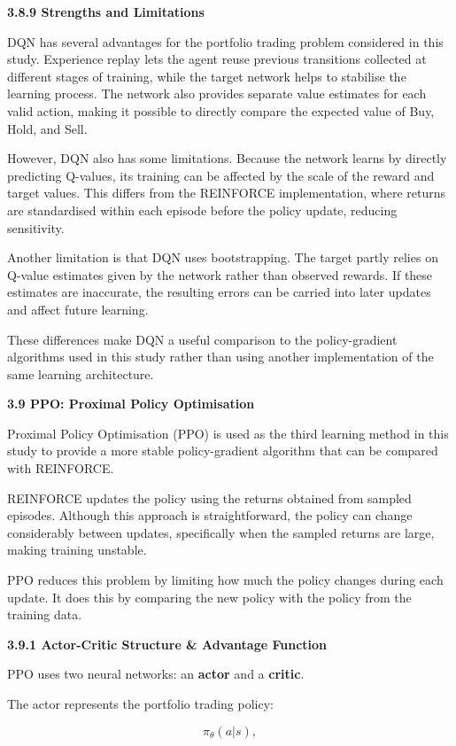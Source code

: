 \textbf{3.8.9 Strengths and Limitations}

DQN has several advantages for the portfolio trading problem considered
in this study. Experience replay lets the agent reuse previous
transitions collected at different stages of training, while the target
network helps to stabilise the learning process. The network also
provides separate value estimates for each valid action, making it
possible to directly compare the expected value of Buy, Hold, and Sell.

However, DQN also has some limitations. Because the network learns by
directly predicting Q-values, its training can be affected by the scale
of the reward and target values. This differs from the REINFORCE
implementation, where returns are standardised within each episode
before the policy update, reducing sensitivity.

Another limitation is that DQN uses bootstrapping. The target partly
relies on Q-value estimates given by the network rather than observed
rewards. If these estimates are inaccurate, the resulting errors can be
carried into later updates and affect future learning.

These differences make DQN a useful comparison to the policy-gradient
algorithms used in this study rather than using another implementation
of the same learning architecture.

\textbf{3.9 PPO: Proximal Policy Optimisation}

Proximal Policy Optimisation (PPO) is used as the third learning method
in this study to provide a more stable policy-gradient algorithm that
can be compared with REINFORCE.

REINFORCE updates the policy using the returns obtained from sampled
episodes. Although this approach is straightforward, the policy can
change considerably between updates, specifically when the sampled
returns are large, making training unstable.

PPO reduces this problem by limiting how much the policy changes during
each update. It does this by comparing the new policy with the policy
from the training data.

\textbf{3.9.1 Actor-Critic Structure \& Advantage Function}

PPO uses two neural networks: an \textbf{actor} and a \textbf{critic}.

The actor represents the portfolio trading policy:

\[\pi_{\theta}\left( a|s \right),\]

